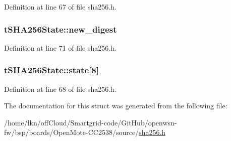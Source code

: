 Definition at line 67 of file sha256.\+h.

\subsubsection[{\texorpdfstring{new\+\_\+digest}{new_digest}}]{ t\+S\+H\+A256\+State\+::new\+\_\+digest}\hypertarget{structt_s_h_a256_state_a958848b0840f5b2f81cd1abce1104034}{}\label{structt_s_h_a256_state_a958848b0840f5b2f81cd1abce1104034}


Definition at line 71 of file sha256.\+h.

\subsubsection[{\texorpdfstring{state}{state}}]{ t\+S\+H\+A256\+State\+::state\mbox{[}8\mbox{]}}\hypertarget{structt_s_h_a256_state_a8e218f4fc37f2dd16ddafb29e6f1f849}{}\label{structt_s_h_a256_state_a8e218f4fc37f2dd16ddafb29e6f1f849}


Definition at line 68 of file sha256.\+h.



The documentation for this struct was generated from the following file\+:\begin{DoxyCompactItemize}
\item 
/home/lkn/off\+Cloud/\+Smartgrid-\/code/\+Git\+Hub/openwsn-\/fw/bsp/boards/\+Open\+Mote-\/\+C\+C2538/source/\hyperlink{sha256_8h}{sha256.\+h}\end{DoxyCompactItemize}
